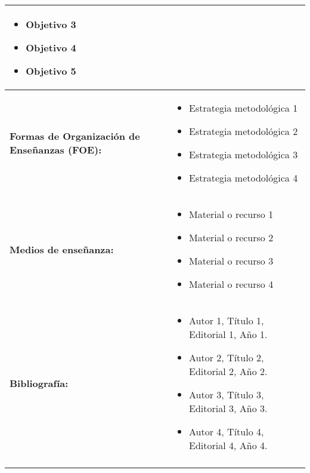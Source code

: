 \begin{xltabular}{\linewidth}{@{}>{\bfseries}X X@{}}
\begin{itemize}
        \item Objetivo 3
        \item Objetivo 4
        \item Objetivo 5
    \end{itemize}               \\
    \midrule
    Formas de Organización de Enseñanzas (FOE): & \begin{itemize}
        \item Estrategia metodológica 1
        \item Estrategia metodológica 2
        \item Estrategia metodológica 3
        \item Estrategia metodológica 4
    \end{itemize}                               \\
    \midrule
    Medios de enseñanza:                       & \begin{itemize}
        \item Material o recurso 1
        \item Material o recurso 2
        \item Material o recurso 3
        \item Material o recurso 4
    \end{itemize}                               \\
    \midrule
    Bibliografía:                              & \begin{itemize}
        \item Autor 1, Título 1, Editorial 1, Año 1.
        \item Autor 2, Título 2, Editorial 2, Año 2.
        \item Autor 3, Título 3, Editorial 3, Año 3.
        \item Autor 4, Título 4, Editorial 4, Año 4.
    \end{itemize}                               \\                                         \\
    \bottomrule
\end{xltabular}